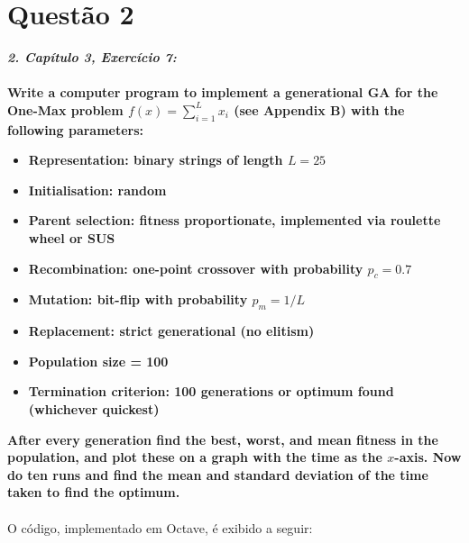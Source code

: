 \documentclass{report}
\begin{document}
	\section*{Questão 2}
	
	\textbf{\textit{2. Capítulo 3, Exercício 7:}}\\\\
	\textbf{Write a computer program to implement a generational GA for the One-Max problem $f(x) = \sum_{i = 1}^{L} x_i$ (see Appendix B) with the following parameters:}\\
	\begin{itemize}
		\item \textbf{Representation: binary strings of length $L = 25$}
		\item \textbf{Initialisation: random}
		\item \textbf{Parent selection: fitness proportionate, implemented via roulette wheel or SUS}
		\item \textbf{Recombination: one-point crossover with probability $p_c = 0.7$}
		\item \textbf{Mutation: bit-flip with probability $p_m = 1/L$}
		\item \textbf{Replacement: strict generational (no elitism)}
		\item \textbf{Population size = 100}
		\item \textbf{Termination criterion: 100 generations or optimum found (whichever quickest)}
	\end{itemize}
	
	\textbf{After every generation find the best, worst, and mean fitness in the population, and plot these on a graph with the time as the $x$-axis. Now do ten runs and find the mean and standard deviation of the time taken to find the optimum.}\\
	
	\paragraph{} O código, implementado em Octave, é exibido a seguir:\\
	
\end{document}

